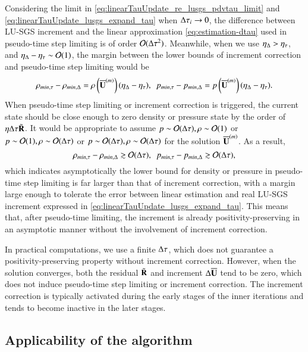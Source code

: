 Considering the limit in \eqref{eq:linearTauUpdate_re_lusgs_pdvtau_limit} 
and \eqref{eq:linearTauUpdate_lusgs_expand_tau}
when $\mathrm\Delta\tau_i\rightarrow 0$,
the difference between LU-SGS increment and the
linear approximation \eqref{eq:estimation-dtau} used in pseudo-time step limiting
is of order $\mathcal{O}(\mathrm\Delta\tau^2)$. 
Meanwhile, when we use $\eta_\mathrm\Delta > \eta_\tau$,
and $\eta_\mathrm\Delta - \eta_\tau \sim \mathcal{O}(1)$,
the margin between the 
lower bounds of 
increment correction and pseudo-time step limiting
would be 
\begin{equation}
\rho_{min,\tau} - \rho_{min,\inc}= 
\rho\left(\uu^{(m)}\right) (\eta_\inc - \eta_\tau),\ \ 
p_{min,\tau} - p_{min,\inc}= 
p\left(\uu^{(m)}\right) (\eta_\inc - \eta_\tau).
\end{equation}
When pseudo-time step limiting or increment correction is triggered,
the current state should be close enough to zero density or 
pressure state by the order of $\eta\mathrm\Delta\tau\tilde{\mathbf{R}}$.
It would be appropriate to assume 
$p\sim\mathcal{O}(\mathrm\Delta\tau), \rho\sim\mathcal{O}(1)$ 
or $p\sim\mathcal{O}(1), \rho\sim\mathcal{O}(\mathrm\Delta\tau)$
or $p\sim\mathcal{O}(\mathrm\Delta\tau), \rho\sim\mathcal{O}(\mathrm\Delta\tau)$ for the solution $\overline{\mathbf{U}}^{(m)}$.
As a result,
\begin{equation}
\rho_{min,\tau} - \rho_{min,\inc} \gtrsim \ord (\inc \tau),\ \ 
p_{min,\tau} - p_{min,\inc} \gtrsim \ord (\inc \tau),
\end{equation}
which indicates asymptotically
the lower bound for density or pressure in pseudo-time step limiting 
is far larger than that of increment correction, 
with a margin large enough to tolerate the error between 
linear estimation and real LU-SGS increment expressed in \eqref{eq:linearTauUpdate_lusgs_expand_tau}.
This means that, after pseudo-time limiting, 
the increment is already positivity-preserving 
in an asymptotic manner without the involvement of 
increment correction.

In practical computations, we use a finite $\mathrm\Delta \tau$, which 
does not guarantee a positivity-preserving property without increment correction.
However, when the solution converges, both the 
residual $\tilde{\mathbf{R}}$ and increment $\mathrm\Delta\overline{\mathbf{U}}$ tend to be zero,
which does not induce pseudo-time step limiting or increment correction.
The increment correction is typically activated during the early stages of the inner iterations and tends to become inactive in the later stages.


\subsection{Applicability of the algorithm}

